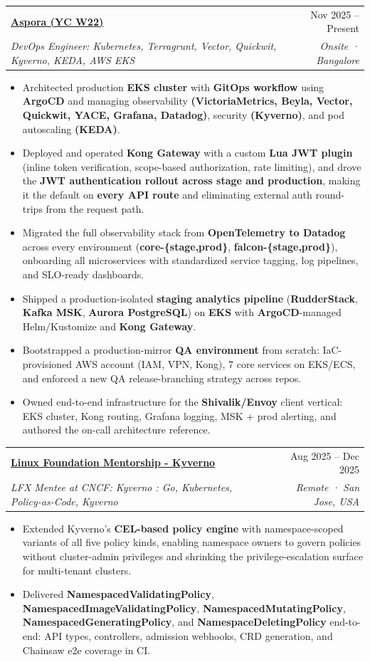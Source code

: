 \documentclass[letterpaper,11pt]{article}
\makeatletter
\newcommand{\resumeItem}[1]{
  \item\small{
    {#1 \vspace{-2pt}}
  }
}
\newcommand{\resumeSubheading}[4]{
  \vspace{-2pt}\item
    \begin{tabular*}{0.97\textwidth}[t]{l@{\extracolsep{\fill}}r}
      \textbf{#1} & #2 \\
      \textit{\small#3} & \textit{\small #4} \\
    \end{tabular*}\vspace{-7pt}
}
\newcommand{\resumeItemListStart}{\begin{itemize}}
\newcommand{\resumeItemListEnd}{\end{itemize}\vspace{-5pt}}
\makeatother
\begin{document}
  \resumeSubheading
    {\href{https://aspora.com}{\underline{Aspora (YC W22)}}}{Nov 2025 – Present}
    {DevOps Engineer: Kubernetes, Terragrunt, Vector, Quickwit, Kyverno, KEDA, AWS EKS}{Onsite · Bangalore}
 \resumeItemListStart
  \resumeItem{Architected production \textbf{EKS cluster} with \textbf{GitOps workflow} using \textbf{ArgoCD} and managing observability \textbf{(VictoriaMetrics, Beyla, Vector, Quickwit, YACE, Grafana, Datadog)}, security \textbf{(Kyverno)}, and pod autoscaling \textbf{(KEDA)}.}
  \resumeItem{Deployed and operated \textbf{Kong Gateway} with a custom \textbf{Lua JWT plugin} (inline token verification, scope-based authorization, rate limiting), and drove the \textbf{JWT authentication rollout across stage and production}, making it the default on \textbf{every API route} and eliminating external auth round-trips from the request path.}
   \resumeItem{Migrated the full observability stack from \textbf{OpenTelemetry to Datadog} across every environment (\textbf{core-\{stage,prod\}}, \textbf{falcon-\{stage,prod\}}), onboarding all microservices with standardized service tagging, log pipelines, and SLO-ready dashboards.}
   \resumeItem{Shipped a production-isolated \textbf{staging analytics pipeline} (\textbf{RudderStack}, \textbf{Kafka MSK}, \textbf{Aurora PostgreSQL}) on \textbf{EKS} with \textbf{ArgoCD}-managed Helm/Kustomize and \textbf{Kong Gateway}.}
   \resumeItem{Bootstrapped a production-mirror \textbf{QA environment} from scratch: IaC-provisioned AWS account (IAM, VPN, Kong), 7 core services on EKS/ECS, and enforced a new QA release-branching strategy across repos.}
   \resumeItem{Owned end-to-end infrastructure for the \textbf{Shivalik/Envoy} client vertical: EKS cluster, Kong routing, Grafana logging, MSK + prod alerting, and authored the on-call architecture reference.}
\resumeItemListEnd

  \resumeSubheading
    {\href{https://lfx.linuxfoundation.org/tools/mentorship}{\underline{Linux Foundation Mentorship - Kyverno}} \href{https://mentorship.lfx.linuxfoundation.org/project/6ad81eb7-295b-4ec8-b9b4-db20e1f3a346}{\faIcon{link}}}{Aug 2025 – Dec 2025}
    {LFX Mentee at CNCF: Kyverno : Go, Kubernetes, Policy-as-Code, Kyverno}{Remote · San Jose, USA}
\resumeItemListStart
  \resumeItem{Extended Kyverno's \textbf{CEL-based policy engine} with namespace-scoped variants of all five policy kinds, enabling namespace owners to govern policies without cluster-admin privileges and shrinking the privilege-escalation surface for multi-tenant clusters.}
  \resumeItem{Delivered \textbf{NamespacedValidatingPolicy}, \textbf{NamespacedImageValidatingPolicy}, \textbf{NamespacedMutatingPolicy}, \textbf{NamespacedGeneratingPolicy}, and \textbf{NamespaceDeletingPolicy} end-to-end: API types, controllers, admission webhooks, CRD generation, and Chainsaw e2e coverage in CI.}
\resumeItemListEnd
\end{document}
